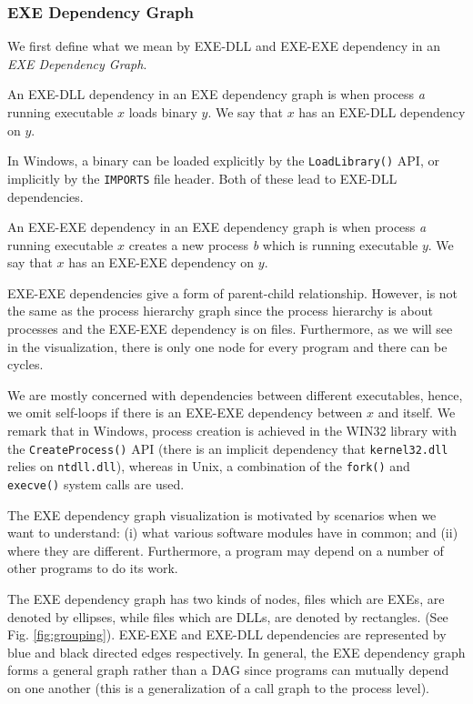\subsubsection{EXE Dependency Graph}
\label{sec:exe-dep-graph}

We first define what we mean by EXE-DLL and EXE-EXE dependency in
an {\em EXE Dependency Graph}.

\begin{definition}
An EXE-DLL dependency in an EXE dependency graph
is when process {\em a} running executable
$x$ loads binary $y$.
We say that $x$ has an EXE-DLL dependency on $y$.
\end{definition}
In Windows, a binary can be loaded explicitly by the {\tt LoadLibrary()} API,
or implicitly by the {\tt IMPORTS} file header.
Both of these lead to EXE-DLL dependencies.

\begin{definition}
An EXE-EXE dependency in an EXE dependency graph
is when process {\em a} running executable $x$ creates
a new process {\em b} which is running executable $y$.
We say that $x$ has an EXE-EXE dependency on $y$.
\end{definition}

EXE-EXE dependencies give a form of parent-child relationship.
However, is not the same as the process hierarchy graph
since the process hierarchy is about processes and the EXE-EXE
dependency is on files.
Furthermore, as we will see in the visualization,
there is only one node for every program and there can be cycles.

We are mostly concerned with dependencies between different executables,
hence, we omit self-loops if there is an EXE-EXE dependency between $x$ and
itself.
We remark that in Windows, process creation is achieved in the WIN32 library
with the {\tt CreateProcess()} API (there
is an implicit dependency that {\tt kernel32.dll} relies on {\tt ntdll.dll}),
where\-as in Unix, a combination of the
{\tt fork()} and {\tt execve()} system calls
are used.

The EXE dependency graph visualization is motivated by scenarios when
we want to understand: (i) what various software modules have in common;
and (ii) where they are different.
Furthermore, a program may depend
on a number of other programs to do its work.

The EXE dependency graph has two kinds of nodes,
files which are EXEs, are denoted by ellipses, while
files which are DLLs, are denoted by rectangles.
(See Fig. \ref{fig:grouping}).
EXE-EXE and EXE-DLL dependencies are represented by
blue and black directed edges respectively.
In general, the EXE dependency graph forms a general graph rather than a
DAG since programs can mutually depend on one another
(this is a generalization of a call graph to the process level).


